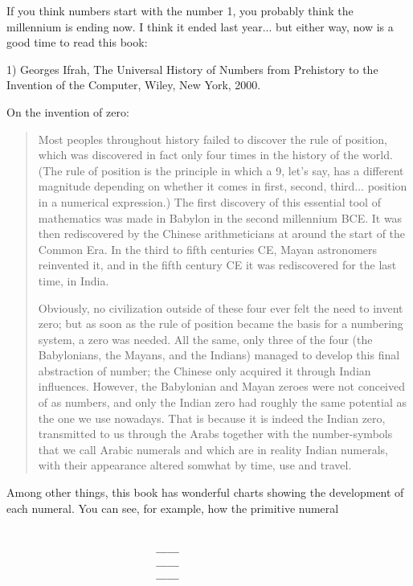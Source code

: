 


If you think numbers start with the number 1, you probably think the
millennium is ending now.  I think it ended last year... but either 
way, now is a good time to read this book:

1) Georges Ifrah, The Universal History of Numbers from Prehistory to
the Invention of the Computer, Wiley, New York, 2000.

On the invention of zero:

\begin{quote}
     Most peoples throughout history failed to discover the rule of
     position, which was discovered in fact only four times in the 
     history of the world.  (The rule of position is the principle in
     which a 9, let's say, has a different magnitude depending on 
     whether it comes in first, second, third... position in a numerical 
     expression.)  The first discovery of this essential tool of  
     mathematics was made in Babylon in the second millennium BCE.  
     It was then rediscovered by the Chinese arithmeticians at around
     the start of the Common Era.  In the third to fifth centuries CE,
     Mayan astronomers reinvented it, and in the fifth century CE it
     was rediscovered for the last time, in India.

     Obviously, no civilization outside of these four ever felt the 
     need to invent zero; but as soon as the rule of position became
     the basis for a numbering system, a zero was needed.  All the same,
     only three of the four (the Babylonians, the Mayans, and the 
     Indians) managed to develop this final abstraction of number;
     the Chinese only acquired it through Indian influences.  However,
     the Babylonian and Mayan zeroes  were not conceived of as numbers,
     and only the Indian zero had roughly the same potential as the 
     one we use nowadays.  That is because it is indeed the Indian zero,
     transmitted to us through the Arabs together with the number-symbols
     that we call Arabic numerals and which are in reality Indian numerals,
     with their appearance altered somwhat by time, use and travel.

\end{quote}
Among other things, this book has wonderful charts showing the
development of each numeral.  You can see, for example, how the
primitive numeral

\begin{verbatim}

                          ____
                          ____
                          ____

\end{verbatim}
    
